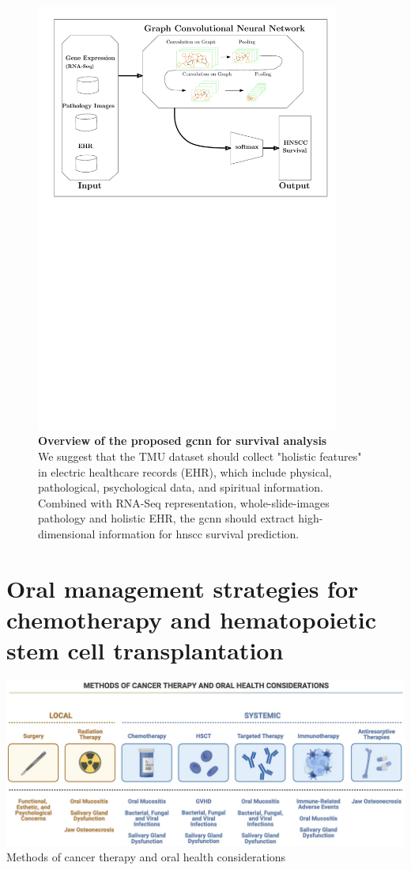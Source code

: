 \documentclass[
paper=landscape,
paper=160mm:90mm, %
fontsize=11pt, %
pagesize, %
parskip=half-, %
]{scrartcl} %
\newcommand{\bcaption}[2]{\caption{\textbf{#1} #2}}
\newcommand{\bcaption}[2]{\caption{\textbf{#1} #2}}
\theoremstyle{mythmstyle} %
\begin{document}
{%
\begin{figure}[hp]
\centering
\includegraphics[width=10cm]{GCNN_survival.pdf}
\bcaption{Overview of the proposed \acrshort{gcnn} for survival analysis}
{\\We suggest that the TMU dataset should collect "holistic features" in electric healthcare records (EHR), which include physical, pathological, psychological data, and spiritual information. Combined with RNA-Seq representation, whole-slide-images pathology and holistic EHR, the \acrfull{gcnn} should extract high-dimensional information for \acrshort{hnscc} survival prediction.}
\label{fig:GCNN}
\end{figure}

} %


\clearpage
\section{Oral management strategies for chemotherapy and hematopoietic stem cell transplantation}
\autocite{Harris2022}
\includegraphics[width=0.8\linewidth]{froh-03-874332-g001.jpg}
Methods of cancer therapy and oral health considerations
\end{document}
